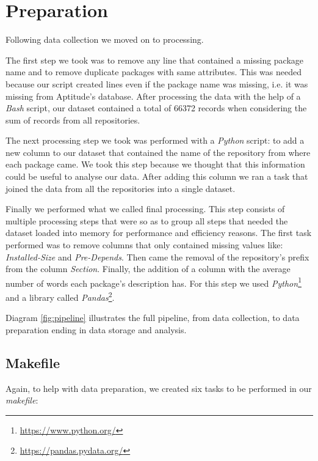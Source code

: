\section{Preparation}
\label{sec:Preparation}

Following data collection we moved on to processing. 

The first step we took was to remove any line that contained a missing package name and to remove duplicate packages with same attributes. This was needed because our script created lines even if the package name was missing, i.e. it was missing from Aptitude's database. After processing the data with the help of a \textit{Bash} script, our dataset contained a total of 66372 records when considering the sum of records from all repositories.

The next processing step we took was performed with a \textit{Python} script: to add a new column to our dataset that contained the name of the repository from where each package came. We took this step because we thought that this information could be useful to analyse our data. After adding this column we ran a task that joined the data from all the repositories into a single dataset.

Finally we performed what we called final processing. This step consists of multiple processing steps that were so as to group all steps that needed the dataset loaded into memory for performance and efficiency reasons. The first task performed was to remove columns that only contained missing values like: \textit{Installed-Size} and \textit{Pre-Depends}. Then came the removal of the repository's prefix from the column \textit{Section}. Finally, the addition of a column with the average number of words each package's description has. For this step we used \textit{Python}\footnote{\url{https://www.python.org/}} and a library called \textit{Pandas}\footnote{\url{https://pandas.pydata.org/}}. 

Diagram  \ref{fig:pipeline} illustrates the full pipeline, from data collection, to data preparation ending in data storage and analysis.


\subsection{Makefile}

Again, to help with data preparation, we created six tasks to be performed in our \textit{makefile}:

